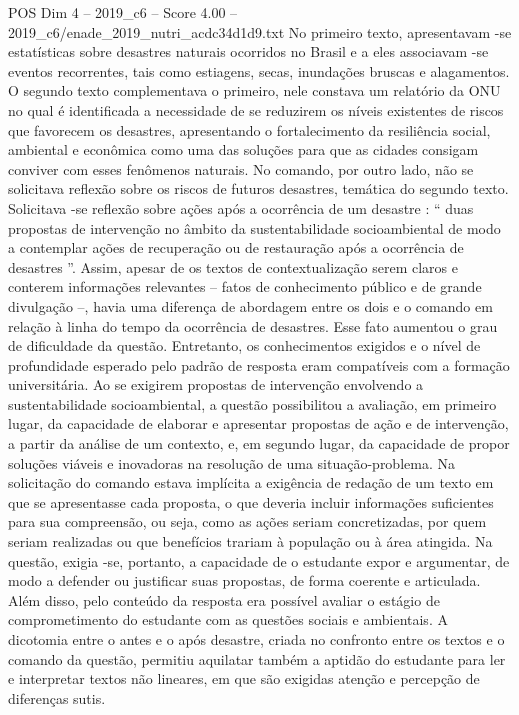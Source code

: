 \begin{textsample}{POS Dim 4 – 2019\_c6 – Score 4.00 – 2019\_c6/enade\_2019\_nutri\_acdc34d1d9.txt}
No primeiro texto, apresentavam -se estatísticas sobre desastres naturais ocorridos no Brasil e a eles associavam -se eventos recorrentes, tais como estiagens, secas, inundações bruscas e alagamentos.
O segundo texto complementava o primeiro, nele constava um relatório da ONU no qual é identificada a necessidade de se reduzirem os níveis existentes de riscos que favorecem os desastres, apresentando o fortalecimento da resiliência social, ambiental e econômica como uma das soluções para que as cidades consigam conviver com esses fenômenos naturais.
No comando, por outro lado, não se solicitava reflexão sobre os riscos de futuros desastres, temática do segundo texto.
Solicitava -se reflexão sobre ações após a ocorrência de um desastre : “ duas propostas de intervenção no âmbito da sustentabilidade socioambiental de modo a contemplar ações de recuperação ou de restauração após a ocorrência de desastres ”.
Assim, apesar de os textos de contextualização serem claros e conterem informações relevantes – fatos de conhecimento público e de grande divulgação –, havia uma diferença de abordagem entre os dois e o comando em relação à linha do tempo da ocorrência de desastres.
Esse fato aumentou o grau de dificuldade da questão.
Entretanto, os conhecimentos exigidos e o nível de profundidade esperado pelo padrão de resposta eram compatíveis com a formação universitária.
Ao se exigirem propostas de intervenção envolvendo a sustentabilidade socioambiental, a questão possibilitou a avaliação, em primeiro lugar, da capacidade de elaborar e apresentar propostas de ação e de intervenção, a partir da análise de um contexto, e, em segundo lugar, da capacidade de propor soluções viáveis e inovadoras na resolução de uma situação-problema.
Na solicitação do comando estava implícita a exigência de redação de um texto em que se apresentasse cada proposta, o que deveria incluir informações suficientes para sua compreensão, ou seja, como as ações seriam concretizadas, por quem seriam realizadas ou que benefícios trariam à população ou à área atingida.
Na questão, exigia -se, portanto, a capacidade de o estudante expor e argumentar, de modo a defender ou justificar suas propostas, de forma coerente e articulada.
Além disso, pelo conteúdo da resposta era possível avaliar o estágio de comprometimento do estudante com as questões sociais e ambientais.
A dicotomia entre o antes e o após desastre, criada no confronto entre os textos e o comando da questão, permitiu aquilatar também a aptidão do estudante para ler e interpretar textos não lineares, em que são exigidas atenção e percepção de diferenças sutis.

\end{textsample}
